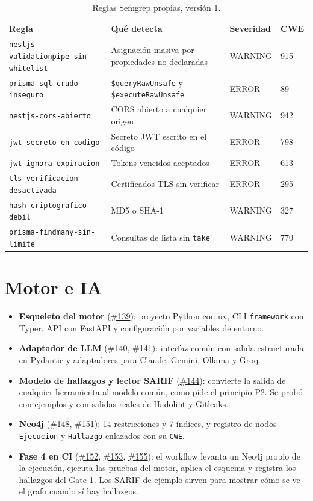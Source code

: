 \documentclass[11pt,a4paper]{report}
\newcommand{\pr}[1]{\href{https://github.com/PracticasESPE/Framework_Desarrollo_Seguro/pull/#1}{\##1}}
\begin{document}
\begin{table}[H]
\centering
\caption{Reglas Semgrep propias, versión 1.}
\begin{tabularx}{\textwidth}{@{}>{\raggedright\arraybackslash\footnotesize}p{5.65cm}LP{2.0cm}P{1.1cm}@{}}
\toprule
\textbf{Regla} & \textbf{Qué detecta} & \textbf{Severidad} & \textbf{CWE}\\
\midrule
\texttt{nestjs-validationpipe-sin-whitelist} & Asignación masiva por propiedades no declaradas & WARNING & 915\\
\texttt{prisma-sql-crudo-inseguro} & \texttt{\$queryRawUnsafe} y \texttt{\$executeRawUnsafe} & ERROR & 89\\
\texttt{nestjs-cors-abierto} & CORS abierto a cualquier origen & WARNING & 942\\
\texttt{jwt-secreto-en-codigo} & Secreto JWT escrito en el código & ERROR & 798\\
\texttt{jwt-ignora-expiracion} & Tokens vencidos aceptados & ERROR & 613\\
\texttt{tls-verificacion-desactivada} & Certificados TLS sin verificar & ERROR & 295\\
\texttt{hash-criptografico-debil} & MD5 o SHA-1 & WARNING & 327\\
\texttt{prisma-findmany-sin-limite} & Consultas de lista sin \texttt{take} & WARNING & 770\\
\bottomrule
\end{tabularx}
\end{table}

\section{Motor e IA}

\begin{itemize}
\item \textbf{Esqueleto del motor} (\pr{139}): proyecto Python con uv, CLI \texttt{framework} con
Typer, API con FastAPI y configuración por variables de entorno.
\item \textbf{Adaptador de LLM} (\pr{140}, \pr{141}): interfaz común con salida estructurada en
Pydantic y adaptadores para Claude, Gemini, Ollama y Groq.
\item \textbf{Modelo de hallazgos y lector SARIF} (\pr{144}): convierte la salida de cualquier
herramienta al modelo común, como pide el principio P2. Se probó con ejemplos y con salidas
reales de Hadolint y Gitleaks.
\item \textbf{Neo4j} (\pr{148}, \pr{151}): 14 restricciones y 7 índices, y registro de nodos
\texttt{Ejecucion} y \texttt{Hallazgo} enlazados con su \texttt{CWE}.
\item \textbf{Fase 4 en CI} (\pr{152}, \pr{153}, \pr{155}): el workflow levanta un Neo4j propio
de la ejecución, ejecuta las pruebas del motor, aplica el esquema y registra los hallazgos del
Gate 1. Los SARIF de ejemplo sirven para mostrar cómo se ve el grafo cuando sí hay hallazgos.
\end{itemize}
\end{document}
